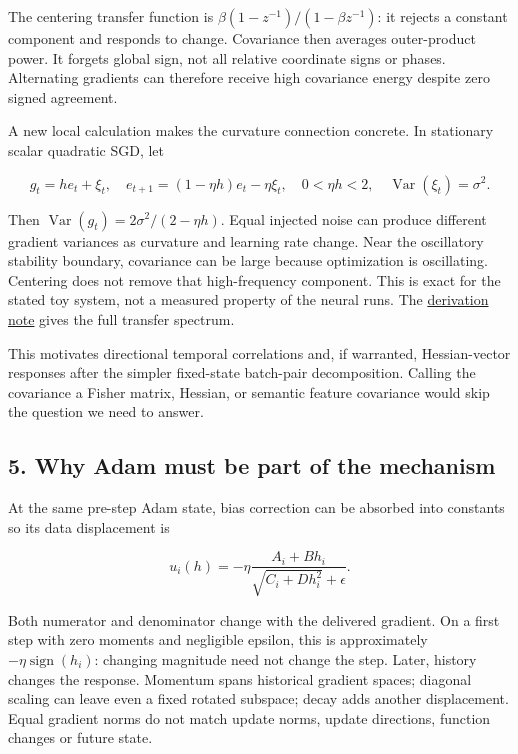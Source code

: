 \documentclass[
  british,
  10pt,
  a4paper,
]{article}
\begin{document}
The centering transfer function is \(\beta(1-z^{-1})/(1-\beta z^{-1})\):
it rejects a constant component and responds to change. Covariance then
averages outer-\allowbreak{}product power. It forgets global sign, not
all relative coordinate signs or phases. Alternating gradients can
therefore receive high covariance energy despite zero signed agreement.

A new local calculation makes the curvature connection concrete. In
stationary scalar quadratic SGD, let

\[
g_t=he_t+\xi_t,\quad e_{t+1}=(1-\eta h)e_t-\eta\xi_t,\quad
0<\eta h<2,\quad \operatorname{Var}(\xi_t)=\sigma^2.
\]

Then \(\operatorname{Var}(g_t)=2\sigma^2/(2-\eta h)\). Equal injected
noise can produce different gradient variances as curvature and learning
rate change. Near the oscillatory stability boundary, covariance can be
large because optimization is oscillating.\allowbreak{} Centering does
not remove that high-\allowbreak{}frequency component. This is exact for
the stated toy system, not a measured property of the neural runs. The
\href{../analysis/mathematical-followup-main-derivations.md}{derivation
note} gives the full transfer spectrum.

This motivates directional temporal correlations and, if warranted,
Hessian-\allowbreak{}vector responses after the simpler
fixed-\allowbreak{}state batch-pair
decompositio\allowbreak{}n.\allowbreak{} Calling the covariance a Fisher
matrix, Hessian, or semantic feature covariance would skip the question
we need to answer.

\subsection{5. Why Adam must be part of the
mechanism}\label{mathematics--why-adam-must-be-part-of-the-mechanism}

At the same pre-step Adam state, bias correction can be absorbed into
constants so its data displacement is

\[
u_i(h)=-\eta\frac{A_i+B h_i}{\sqrt{C_i+D h_i^2}+\epsilon}.
\]

Both numerator and denominator change with the delivered gradient. On a
first step with zero moments and negligible epsilon, this is
approximately \(-\eta\operatorname{sign}(h_i)\): changing magnitude need
not change the step. Later, history changes the response. Momentum spans
historical gradient spaces; diagonal scaling can leave even a fixed
rotated subspace; decay adds another
displacement\allowbreak{}.\allowbreak{} Equal gradient norms do not
match update norms, update directions,\allowbreak{} function changes or
future state.
\end{document}
